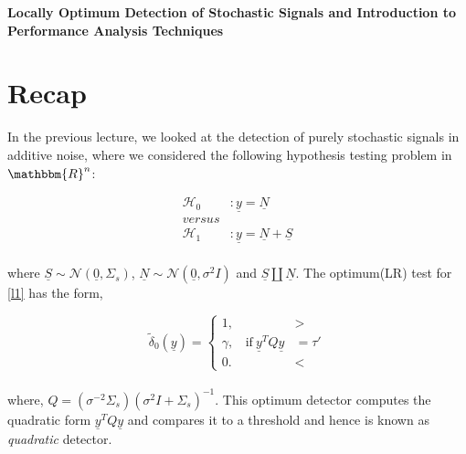 \documentclass[12pt]{report}
\begin{document}
\maketitle

\begin{center}
{\Large \bf Locally Optimum Detection of Stochastic Signals and Introduction to Performance Analysis Techniques }
\end{center}
	
	

\section{Recap}
In the previous lecture, we looked at the detection of purely stochastic signals in additive noise, where we considered the following hypothesis testing problem in $\mathbbm{R}^{n}$:

\begin{equation}
\label{l1}
\begin{aligned}
\mathcal{H}_0 &: {\underline{y}} = {\underline{N}}   \\
versus\\
\mathcal{H}_1 &: {\underline{y}} = {\underline{N}} + {\underline{S}}   
\end{aligned}
\end{equation}\\
where   ${\underline{S}} \sim \mathcal{N}({\underline{0}},\Sigma_s)$, ${\underline{N}} \sim \mathcal{N}({\underline{0}},\sigma^2I)$ and ${\underline{S}}\amalg {\underline{N}}$. The optimum(LR) test for \eqref{l1} has the form,
 
\begin{equation}
\tilde{\delta}_0 (\underline{y}) =  
\begin{cases}
1, &>  \\
\gamma,  \ \ \ \  \mbox{if}~{\underline{y}}^TQ{\underline{y}}&= \tau'  \\
0. &<
\end{cases}
\end{equation}\\
where, $Q =(\sigma^{-2}\Sigma_s)(\sigma^{2}I+\Sigma_s)^{-1}$. This optimum detector computes the quadratic form ${\underline{y}}^TQ{\underline{y}}$ and compares it to a threshold and hence is known as \textit{quadratic} detector.
\end{document}
